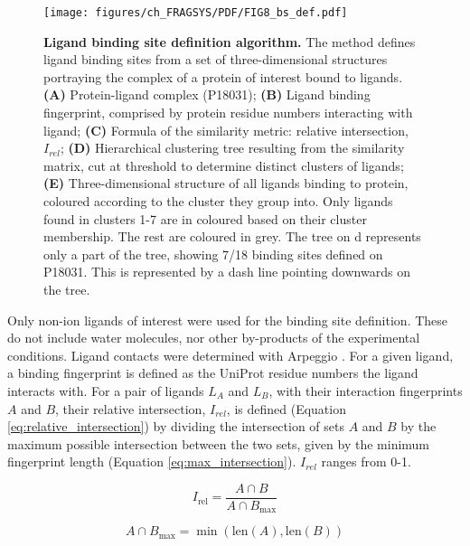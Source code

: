 \begin{figure}[H]
    \centering
    \texttt{[image: figures/ch\_FRAGSYS/PDF/FIG8\_bs\_def.pdf]}
    \caption[Ligand binding site definition algorithm]{\textbf{Ligand binding site definition algorithm.} The method defines ligand binding sites from a set of three-dimensional structures portraying the complex of a protein of interest bound to ligands. \textbf{(A)} Protein-ligand complex (P18031); \textbf{(B)} Ligand binding fingerprint, comprised by protein residue numbers interacting with ligand; \textbf{(C)} Formula of the similarity metric: relative intersection, $I_{rel}$; \textbf{(D)} Hierarchical clustering tree resulting from the similarity matrix, cut at threshold to determine distinct clusters of ligands; \textbf{(E)} Three-dimensional structure of all ligands binding to protein, coloured according to the cluster they group into. Only ligands found in clusters 1-7 are in coloured based on their cluster membership. The rest are coloured in grey. The tree on d represents only a part of the tree, showing 7/18 binding sites defined on P18031. This is represented by a dash line pointing downwards on the tree.}
    \label{fig:fragsys_bs_def}
\end{figure}

Only non-ion ligands of interest were used for the binding site definition. These do not include water molecules, nor other by-products of the experimental conditions. Ligand contacts were determined with Arpeggio \cite{JUBB_2017_ARPEGGIO}. For a given ligand, a binding fingerprint is defined as the UniProt residue numbers the ligand interacts with. For a pair of ligands $L_{A}$ and $L_{B}$, with their interaction fingerprints $A$ and $B$, their relative intersection, $I_{rel}$, is defined (Equation \ref{eq:relative_intersection}) by dividing the intersection of sets $A$ and $B$ by the maximum possible intersection between the two sets, given by the minimum fingerprint length (Equation \ref{eq:max_intersection}). $I_{rel}$ ranges from 0-1.

\begin{equation}
    I_{\mathrm{rel}} = \frac{A \cap B}{A \cap B_{\mathrm{max}}}
\label{eq:relative_intersection} %
\end{equation}

\begin{equation}
    A \cap B_{\mathrm{max}} = \min(\mathrm{len}(A), \mathrm{len}(B))
\label{eq:max_intersection}
\end{equation}


